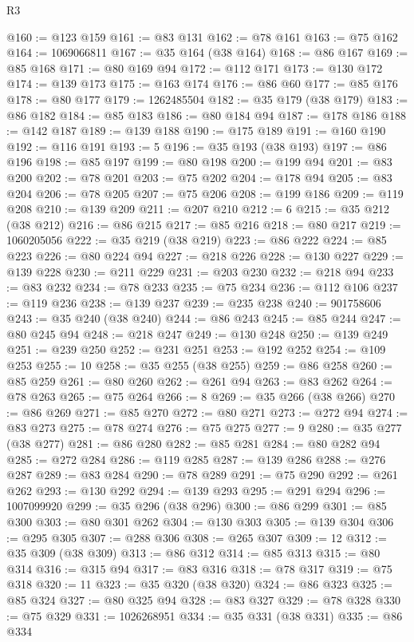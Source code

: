 \begin{lexlean}{R3}
\begin{coremodule}
@160 := @123 @159
@161 := @83 @131
@162 := @78 @161
@163 := @75 @162
@164 := 1069066811
@167 := @35 @164 (@38 @164)
@168 := @86 @167
@169 := @85 @168
@171 := @80 @169 @94
@172 := @112 @171
@173 := @130 @172
@174 := @139 @173
@175 := @163 @174
@176 := @86 @60
@177 := @85 @176
@178 := @80 @177
@179 := 1262485504
@182 := @35 @179 (@38 @179)
@183 := @86 @182
@184 := @85 @183
@186 := @80 @184 @94
@187 := @178 @186
@188 := @142 @187
@189 := @139 @188
@190 := @175 @189
@191 := @160 @190
@192 := @116 @191
@193 := 5
@196 := @35 @193 (@38 @193)
@197 := @86 @196
@198 := @85 @197
@199 := @80 @198
@200 := @199 @94
@201 := @83 @200
@202 := @78 @201
@203 := @75 @202
@204 := @178 @94
@205 := @83 @204
@206 := @78 @205
@207 := @75 @206
@208 := @199 @186
@209 := @119 @208
@210 := @139 @209
@211 := @207 @210
@212 := 6
@215 := @35 @212 (@38 @212)
@216 := @86 @215
@217 := @85 @216
@218 := @80 @217
@219 := 1060205056
@222 := @35 @219 (@38 @219)
@223 := @86 @222
@224 := @85 @223
@226 := @80 @224 @94
@227 := @218 @226
@228 := @130 @227
@229 := @139 @228
@230 := @211 @229
@231 := @203 @230
@232 := @218 @94
@233 := @83 @232
@234 := @78 @233
@235 := @75 @234
@236 := @112 @106
@237 := @119 @236
@238 := @139 @237
@239 := @235 @238
@240 := 901758606
@243 := @35 @240 (@38 @240)
@244 := @86 @243
@245 := @85 @244
@247 := @80 @245 @94
@248 := @218 @247
@249 := @130 @248
@250 := @139 @249
@251 := @239 @250
@252 := @231 @251
@253 := @192 @252
@254 := @109 @253
@255 := 10
@258 := @35 @255 (@38 @255)
@259 := @86 @258
@260 := @85 @259
@261 := @80 @260
@262 := @261 @94
@263 := @83 @262
@264 := @78 @263
@265 := @75 @264
@266 := 8
@269 := @35 @266 (@38 @266)
@270 := @86 @269
@271 := @85 @270
@272 := @80 @271
@273 := @272 @94
@274 := @83 @273
@275 := @78 @274
@276 := @75 @275
@277 := 9
@280 := @35 @277 (@38 @277)
@281 := @86 @280
@282 := @85 @281
@284 := @80 @282 @94
@285 := @272 @284
@286 := @119 @285
@287 := @139 @286
@288 := @276 @287
@289 := @83 @284
@290 := @78 @289
@291 := @75 @290
@292 := @261 @262
@293 := @130 @292
@294 := @139 @293
@295 := @291 @294
@296 := 1007099920
@299 := @35 @296 (@38 @296)
@300 := @86 @299
@301 := @85 @300
@303 := @80 @301 @262
@304 := @130 @303
@305 := @139 @304
@306 := @295 @305
@307 := @288 @306
@308 := @265 @307
@309 := 12
@312 := @35 @309 (@38 @309)
@313 := @86 @312
@314 := @85 @313
@315 := @80 @314
@316 := @315 @94
@317 := @83 @316
@318 := @78 @317
@319 := @75 @318
@320 := 11
@323 := @35 @320 (@38 @320)
@324 := @86 @323
@325 := @85 @324
@327 := @80 @325 @94
@328 := @83 @327
@329 := @78 @328
@330 := @75 @329
@331 := 1026268951
@334 := @35 @331 (@38 @331)
@335 := @86 @334

\end{coremodule}
\end{lexlean}
